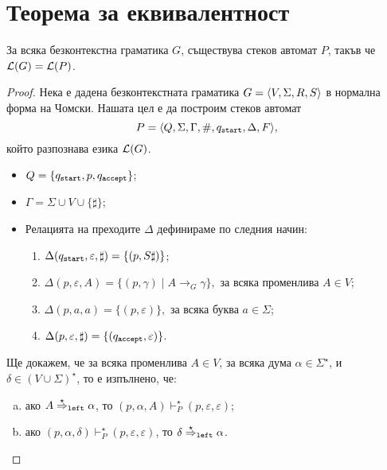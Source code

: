 \section{Теорема за еквивалентност}

\begin{important}
  \begin{lemma}
    За всяка безконтекстна граматика $G$,
    съществува стеков автомат $P$, такъв че $\mathcal{L}(G) = \mathcal{L}(P)$.
  \end{lemma}
\end{important}
\begin{proof}
  Нека е дадена безконтекстната граматика $G = \langle{V,\Sigma,R,S}\rangle$ в нормална форма на Чомски.
  Нашата цел е да построим стеков автомат
  \[P = \langle{Q,\Sigma,\Gamma,\#,q_{\texttt{start}},\Delta,F}\rangle,\] който разпознава езика $\mathcal{L}(G)$.
  \begin{itemize}
  \item
    $Q = \{q_{\texttt{start}},p,q_{\texttt{accept}}\}$;
  \item
    $\Gamma = \Sigma \cup V \cup \{\sharp\}$;
  \item
    Релацията на преходите $\Delta$ дефинираме по следния начин:
    \begin{enumerate}[(1)]
    \item 
      $\Delta(q_{\texttt{start}}, \varepsilon, \sharp ) = \{(p,S\sharp)\}$;
    \item
      $\Delta(p,\varepsilon,A) = \{(p,\gamma)\mid A\to_G \gamma\}, \text{ за всяка променлива }A \in V$;
    \item
      $\Delta(p,a,a) = \{(p,\varepsilon)\}, \text{ за всяка буква } a \in \Sigma$;
    \item
      $\Delta(p,\varepsilon,\sharp) = \{(q_{\texttt{accept}}, \varepsilon)\}$.
    \end{enumerate}
  \end{itemize}

  Ще докажем, че за всяка променлива $A \in V$, за всяка дума $\alpha \in \Sigma^\star$,
  и $\delta \in (V \cup \Sigma)^\star$, то е изпълнено, че:
  \begin{enumerate}[(a)]
  \item
    ако $A \stackrel{{\star}}{\Rightarrow}_{\texttt{left}} \alpha$, то $(p, \alpha, A) \vdash^\star_P (p, \varepsilon, \varepsilon)$;
  \item
    ако $(p, \alpha, \delta) \vdash^\star_P (p, \varepsilon, \varepsilon)$, то $\delta \stackrel{{\star}}{\Rightarrow}_{\texttt{left}} \alpha$.
  \end{enumerate}
  

\end{proof}
